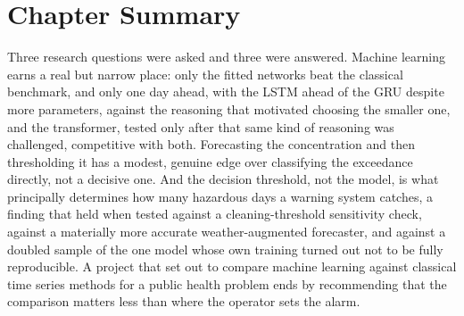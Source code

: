 \documentclass[12pt,a4paper]{report}
\begin{document}
\section{Chapter Summary}

Three research questions were asked and three were answered. Machine
learning earns a real but narrow place: only the fitted networks
beat the classical benchmark, and only one day ahead, with the LSTM ahead
of the GRU despite more parameters, against the reasoning that motivated
choosing the smaller one, and the transformer, tested only after that same
kind of reasoning was challenged, competitive with both. Forecasting the
concentration and then thresholding it has a modest, genuine edge over
classifying the exceedance directly, not a decisive one. And the decision
threshold, not the model, is what principally determines how many
hazardous days a warning system catches, a finding that held when
tested against a cleaning-threshold sensitivity check, against a
materially more accurate weather-augmented forecaster, and against a
doubled sample of the one model whose own training turned out not to be
fully reproducible. A project that set out to compare machine learning
against classical time series methods for a public health problem ends by
recommending that the comparison matters less than where the operator sets
the alarm.



\end{document}
